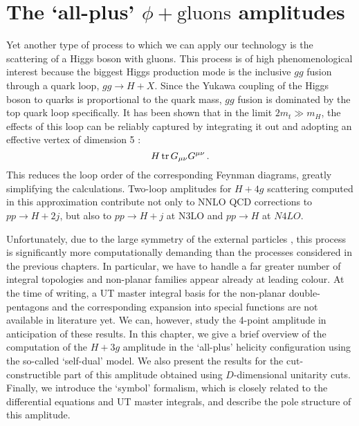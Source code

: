 \documentclass[main.tex]{subfiles}
\begin{document}
\chapter{The `all-plus' $\phi+\text{gluons}$ amplitudes} \label{sec:selfdual}
Yet another type of process to which we can apply our technology is the scattering of a Higgs boson with gluons. This process is of high phenomenological interest because the biggest Higgs production mode is the inclusive $gg$ fusion through a quark loop, $gg \rightarrow H + X$. Since the Yukawa coupling of the Higgs boson to quarks is proportional to the quark mass, $gg$ fusion is dominated by the top quark loop specifically. It has been shown that in the limit $2m_t \gg m_H$, the effects of this loop can be reliably captured by integrating it out and adopting an effective vertex of dimension 5 \cite{Wilczek:1977, Djouadi:1991}: 
\begin{equation}
    H \operatorname{\rm tr} G_{\mu\nu} G^{\mu\nu} \,.
\end{equation}
This reduces the loop order of the corresponding Feynman diagrams, greatly simplifying the calculations. Two-loop amplitudes for $H+4g$ scattering computed in this approximation contribute not only to NNLO QCD corrections to $pp \rightarrow H+2j$, but also to $pp \rightarrow H+j$ at N3LO and $pp \rightarrow H$ at $N4LO$.

Unfortunately, due to the large symmetry of the external particles , this process is significantly more computationally demanding than the processes considered in the previous chapters. In particular, we have to handle a far greater number of integral topologies and non-planar families appear already at leading colour. At the time of writing, a UT master integral basis for the non-planar double-pentagons and the corresponding expansion into special functions are not available in literature yet. We can, however, study the 4-point amplitude in anticipation of these results. In this chapter, we give a brief overview of the computation of the $H+3g$ amplitude in the `all-plus' helicity configuration using the so-called `self-dual' model. We also present the results for the cut-constructible part of this amplitude obtained using $D$-dimensional unitarity cuts. Finally, we introduce the `symbol' formalism, which is closely related to the differential equations and UT master integrals, and describe the pole structure of this amplitude.
\end{document}
